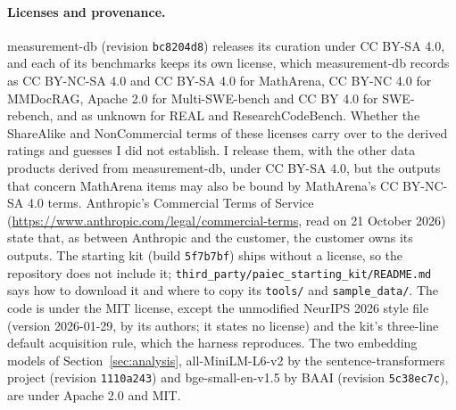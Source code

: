 \paragraph{Licenses and provenance.}
measurement-db (revision \texttt{bc8204d8}) releases its curation under CC BY-SA 4.0, and each of its benchmarks keeps its own license, which measurement-db records as CC BY-NC-SA 4.0 and CC BY-SA 4.0 for MathArena, CC BY-NC 4.0 for MMDocRAG, Apache 2.0 for Multi-SWE-bench and CC BY 4.0 for SWE-rebench, and as unknown for REAL and ResearchCodeBench. Whether the ShareAlike and NonCommercial terms of these licenses carry over to the derived ratings and guesses I did not establish. I release them, with the other data products derived from measurement-db, under CC BY-SA 4.0, but the outputs that concern MathArena items may also be bound by MathArena's CC BY-NC-SA 4.0 terms. Anthropic's Commercial Terms of Service (\url{https://www.anthropic.com/legal/commercial-terms}, read on 21 October 2026) state that, as between Anthropic and the customer, the customer owns its outputs. The starting kit (build \texttt{5f7b7bf}) ships without a license, so the repository does not include it; \texttt{third\_party/paiec\_starting\_kit/README.md} says how to download it and where to copy its \texttt{tools/} and \texttt{sample\_data/}. The code is under the MIT license, except the unmodified NeurIPS 2026 style file (version 2026-01-29, by its authors; it states no license) and the kit's three-line default acquisition rule, which the harness reproduces. The two embedding models of Section~\ref{sec:analysis}, all-MiniLM-L6-v2 by the sentence-transformers project (revision \texttt{1110a243}) and bge-small-en-v1.5 by BAAI (revision \texttt{5c38ec7c}), are under Apache 2.0 and MIT.

